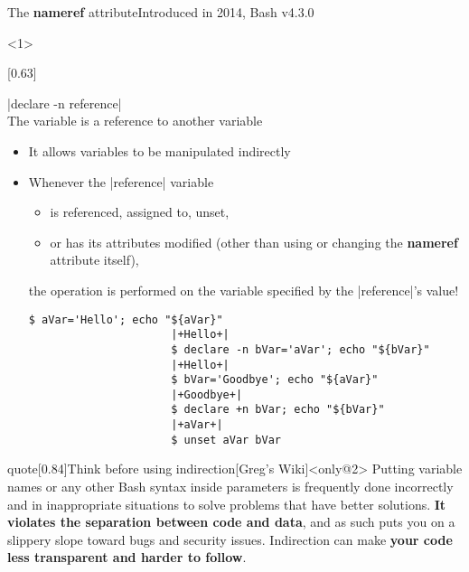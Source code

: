 
\begin{frame}[fragile]{The \textbf{nameref} attribute}{Introduced in 2014, Bash v4.3.0}
    \vspace{-2mm}
    \begin{onlyenv}<1>
        \vspace{-2mm}
        \begin{varblock}{}[0.63\textwidth]{}
        \begin{description}
            \item[\textbf{Reference:}]
                \bash|declare -n reference|\\
                The variable is a reference to another variable
        \end{description}
        \end{varblock}
        \begin{itemize}
            \item It allows variables to be manipulated indirectly
            \item Whenever the \bash|reference| variable
                  \begin{itemize}
                      \item is referenced, assigned to, unset,
                      \item or has its attributes modified (other than using or changing the \textbf{nameref} attribute itself),
                  \end{itemize}
                  the operation is performed on the variable specified by the \bash|reference|'s value!
                  \begin{lstlisting}[style=MyBash, style=oddnumbers, xleftmargin=6mm, xrightmargin=15mm, aboveskip=3mm]
                      $ aVar='Hello'; echo "${aVar}"
                      |+Hello+|
                      $ declare -n bVar='aVar'; echo "${bVar}"
                      |+Hello+|
                      $ bVar='Goodbye'; echo "${aVar}"
                      |+Goodbye+|
                      $ declare +n bVar; echo "${bVar}"
                      |+aVar+|
                      $ unset aVar bVar
                  \end{lstlisting}
        \end{itemize}
    \end{onlyenv}
    \begin{varblock}{quote}[0.84\textwidth]{Think before using indirection}[Greg's Wiki]<only@2>
        Putting variable names or any other Bash syntax inside parameters is frequently done incorrectly and in inappropriate situations to solve problems that have better solutions.
        \textbf{It violates the separation between code and data}, and as such puts you on a slippery slope toward bugs and security issues.
        Indirection can make \textbf{your code less transparent and harder to follow}.


\end{varblock}
\end{frame}
